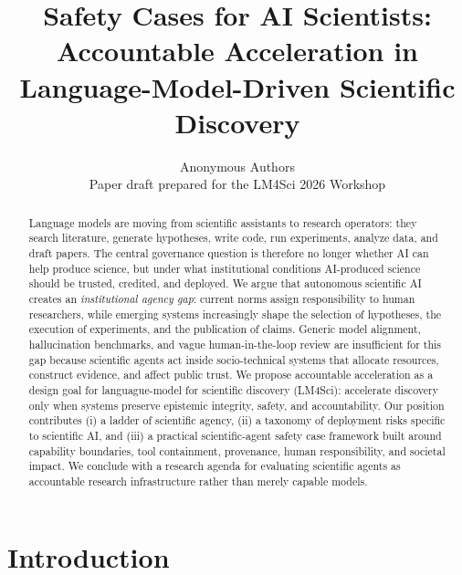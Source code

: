 \documentclass{article}
\title{Safety Cases for AI Scientists: \\
Accountable Acceleration in Language-Model-Driven Scientific Discovery}
\author{Anonymous Authors \\
Paper draft prepared for the LM4Sci 2026 Workshop}
\newcommand{\position}{accountable acceleration}
\newcommand{\safetycase}{scientific-agent safety case}
\begin{document}
\ifcolmsubmission
\linenumbers
\fi

\maketitle

\begin{abstract}
Language models are moving from scientific assistants to research operators: they search literature, generate hypotheses, write code, run experiments, analyze data, and draft papers. The central governance question is therefore no longer whether AI can help produce science, but under what institutional conditions AI-produced science should be trusted, credited, and deployed. We argue that autonomous scientific AI creates an \emph{institutional agency gap}: current norms assign responsibility to human researchers, while emerging systems increasingly shape the selection of hypotheses, the execution of experiments, and the publication of claims. Generic model alignment, hallucination benchmarks, and vague human-in-the-loop review are insufficient for this gap because scientific agents act inside socio-technical systems that allocate resources, construct evidence, and affect public trust. We propose \position{} as a design goal for languague-model for scientific discovery (LM4Sci): accelerate discovery only when systems preserve epistemic integrity, safety, and accountability. Our position contributes (i) a ladder of scientific agency, (ii) a taxonomy of deployment risks specific to scientific AI, and (iii) a practical \safetycase{} framework built around capability boundaries, tool containment, provenance, human responsibility, and societal impact. We conclude with a research agenda for evaluating scientific agents as accountable research infrastructure rather than merely capable models.
\end{abstract}

\section{Introduction}
\end{document}
